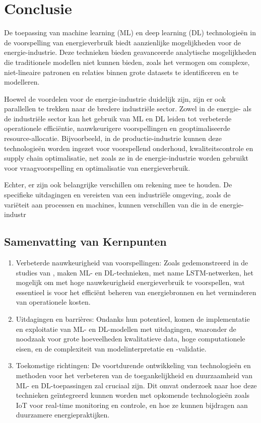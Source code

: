 \section{Conclusie}

De toepassing van machine learning (ML) en deep learning (DL) technologieën in de voorspelling van energieverbruik biedt aanzienlijke mogelijkheden voor de energie-industrie. Deze technieken bieden geavanceerde analytische mogelijkheden die traditionele modellen niet kunnen bieden, zoals het vermogen om complexe, niet-lineaire patronen en relaties binnen grote datasets te identificeren en te modelleren.

Hoewel de voordelen voor de energie-industrie duidelijk zijn, zijn er ook parallellen te trekken naar de bredere industriële sector. Zowel in de energie- als de industriële sector kan het gebruik van ML en DL leiden tot verbeterde operationele efficiëntie, nauwkeurigere voorspellingen en geoptimaliseerde resource-allocatie. Bijvoorbeeld, in de productie-industrie kunnen deze technologieën worden ingezet voor voorspellend onderhoud, kwaliteitscontrole en supply chain optimalisatie, net zoals ze in de energie-industrie worden gebruikt voor vraagvoorspelling en optimalisatie van energieverbruik.

Echter, er zijn ook belangrijke verschillen om rekening mee te houden. De specifieke uitdagingen en vereisten van een industriële omgeving, zoals de variëteit aan processen en machines, kunnen verschillen van die in de energie-industr

\subsection{Samenvatting van Kernpunten}
\begin{enumerate}
    \item Verbeterde nauwkeurigheid van voorspellingen: Zoals gedemonstreerd in de studies van \textcite{Alanbar_2020}, maken ML- en DL-technieken, met name LSTM-netwerken, het mogelijk om met hoge nauwkeurigheid energieverbruik te voorspellen, wat essentieel is voor het efficiënt beheren van energiebronnen en het verminderen van operationele kosten.
    \item Uitdagingen en barrières: Ondanks hun potentieel, komen de implementatie en exploitatie van ML- en DL-modellen met uitdagingen, waaronder de noodzaak voor grote hoeveelheden kwalitatieve data, hoge computationele eisen, en de complexiteit van modelinterpretatie en -validatie.
    \item Toekomstige richtingen: De voortdurende ontwikkeling van technologieën en methoden voor het verbeteren van de toegankelijkheid en duurzaamheid van ML- en DL-toepassingen zal cruciaal zijn. Dit omvat onderzoek naar hoe deze technieken geïntegreerd kunnen worden met opkomende technologieën zoals IoT voor real-time monitoring en controle, en hoe ze kunnen bijdragen aan duurzamere energiepraktijken.
\end{enumerate}

